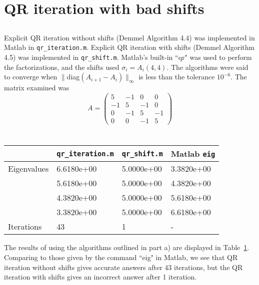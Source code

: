 \documentclass[11pt]{article} %
\begin{document}
\section{QR iteration with bad shifts}
\subsection{} %
Explicit QR iteration without shifts (Demmel Algorithm 4.4) was implemented in Matlab in  \verb$qr_iteration.m$. Explicit QR iteration with shifts (Demmel Algorithm 4.5) was implemented in  \verb$qr_shift.m$. Matlab's built-in ``qr" was used to perform the factorizations, and the shifts used $\sigma_i = A_i(4,4)$. The algorithms were said to converge when $\|$diag$(A_{i+1} - A_i) \|_\infty$ is less than the tolerance $10^{-6}$. The matrix examined was
\begin{equation}
A = \left ( \begin{array}{rrrr}
5 & -1 & 0 & 0\\
-1 & 5 & -1 &0\\
0 & -1 & 5 & -1 \\
0 & 0 & -1 & 5 
\end{array} \right )
\end{equation}
\subsection{} %
\begin{table}[h!]
\centering
\begin{tabular}{|l |l | l | l | } \hline
 &\verb$qr_iteration.m$ &   \verb$qr_shift.m$ & Matlab \verb$eig$ \\ \hline
Eigenvalues   & 6.6180e+00 &  5.0000e+00 &  3.3820e+00  \\
 &  5.6180e+00 &  5.0000e+00 &  4.3820e+00  \\
  & 4.3820e+00  & 5.0000e+00  & 5.6180e+00  \\
  & 3.3820e+00  & 5.0000e+00 &  6.6180e+00  \\ \hline
Iterations & 43 &1 &- \\ \hline
\end{tabular}
\caption{}
\label{tab:4b}
\end{table}
The results of using the algorithms outlined in part a) are displayed in Table~\ref{tab:4b}. Comparing to those given by the command ``eig" in Matlab, we see that QR iteration without shifts gives accurate answers after 43 iterations, but the QR iteration with shifts gives an incorrect answer after 1 iteration.
\end{document}
